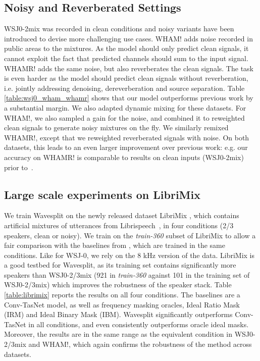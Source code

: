 \documentclass[letterpaper, onecolumn,10 pt]{IEEEtran}
\begin{document}
\subsection{Noisy and Reverberated Settings}

WSJ0-2mix was recorded in clean conditions and noisy variants have been introduced to devise more challenging use cases. WHAM! \cite{wichern19:WHAM} adds noise recorded in public areas to the mixtures. As the model should only predict clean signals, it cannot exploit the fact that predicted channels should sum to the input signal. WHAMR! \cite{maciejewski19:whamr} adds the same noise, but also reverberates the clean signals. The task is even harder as the model should predict clean signals without reverberation, i.e. jointly addressing denoising, dereverberation and source separation. Table \ref{table:wsj0_wham_whamr} shows that our model outperforms previous work by a substantial margin. We also adapted dynamic mixing for these datasets. For WHAM!, we also sampled a gain for the noise, and combined it to reweighted clean signals to generate noisy mixtures on the fly. We similarly remixed WHAMR!, except that we reweighted reverberated signals with noise. On both datasets, this leads to an even larger improvement over previous work: e.g. our accuracy on WHAMR! is comparable to results on clean inputs (WSJ0-2mix) prior to~\cite{wang18:deep_clustering_objectives}.

\subsection{Large scale experiments on LibriMix}

We train Wavesplit on the newly released dataset LibriMix \cite{librimix}, which contains artificial mixtures of utterances from Librispeech~\cite{panayotov2015librispeech}, in four conditions (2/3 speakers, clean or noisy). We train on the \textit{train-360} subset of LibriMix to allow a fair comparison with the baselines from \cite{librimix}, which are trained in the same conditions. Like for WSJ-0, we rely on the 8 kHz version of the data. LibriMix is a good testbed for Wavesplit, as its training set contains significantly more speakers than WSJ0-2/3mix (921 in \textit{train-360} against 101 in the training set of WSJ0-{2/3}mix) which improves the robustness of the speaker stack. Table \ref{table:librimix} reports the results on all four conditions. The baselines are a Conv-TasNet model, as well as frequency masking oracles, Ideal Ratio Mask (IRM) and Ideal Binary Mask (IBM). Wavesplit significantly outperforms Conv-TasNet in all conditions, and even consistently outperforms oracle ideal masks. Moreover, the results are in the same range as the equivalent condition in WSJ0-{2/3}mix and WHAM!, which again confirms the robustness of the method across datasets.
\end{document}
